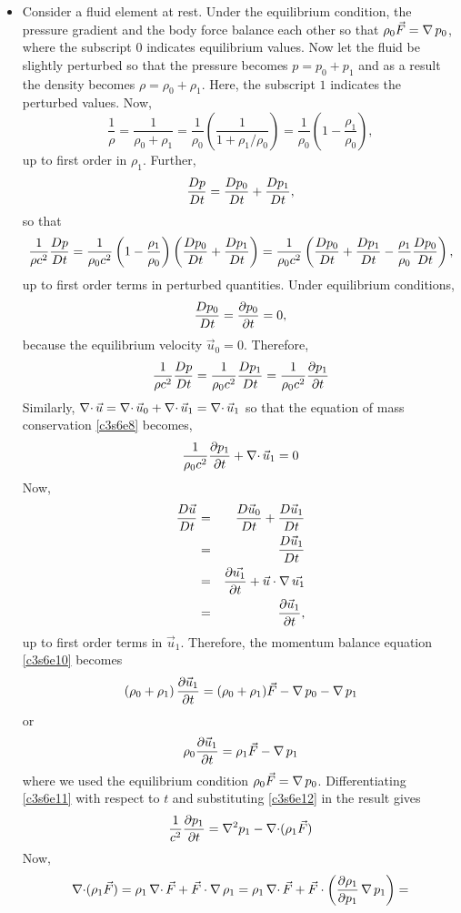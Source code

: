 \begin{itemize}
\item Consider a fluid element at rest. Under the equilibrium condition, the pressure gradient and the body force balance each other so that $\rho_0\vec{F} = \operatorname{\nabla} p_0$, where the 
subscript $0$ indicates equilibrium values. Now let the fluid be slightly perturbed so that the pressure becomes $p = p_0 + p_1$ and as a result the density becomes $\rho = \rho_0 +
\rho_1$. Here, the subscript $1$ indicates the perturbed values. Now,
\[
\frac{1}{\rho} = \frac{1}{\rho_0 + \rho_1} = \frac{1}{\rho_0}\left(\frac{1}{1 + \rho_1/\rho_0}\right) = \frac{1}{\rho_0}\left(1 - \frac{\rho_1}{\rho_0}\right),
\]
up to first order in $\rho_1$. Further,
\[
\frac{D{p}}{Dt} = \frac{D{p_0}}{Dt} + \frac{D{p_1}}{Dt},
\]
so that
\[
\frac{1}{\rho c^2}\frac{D{p}}{Dt} = \frac{1}{\rho_0 c^2}\left(1 - \frac{\rho_1}{\rho_0}\right)\left(\frac{D{p_0}}{Dt} + \frac{D{p_1}}{Dt}\right)
= \frac{1}{\rho_0 c^2}\left(\frac{D{p_0}}{Dt} + \frac{D{p_1}}{Dt} - \frac{\rho_1}{\rho_0}\frac{D{p_0}}{Dt}\right),
\]
up to first order terms in perturbed quantities. Under equilibrium conditions, 
\[
\frac{D{p_0}}{Dt} = \frac{\partial{p_0}}{\partial{t}} = 0,
\]
because the equilibrium velocity $\vec{u}_0 = 0$. Therefore,
\[
\frac{1}{\rho c^2}\frac{D{p}}{Dt} = \frac{1}{\rho_0 c^2}\frac{D{p_1}}{Dt} = \frac{1}{\rho_0 c^2}\frac{\partial{p_1}}{\partial{t}}
\]
Similarly, $\operatorname{\nabla\cdot}\vec{u} = \operatorname{\nabla\cdot}\vec{u}_0 + \operatorname{\nabla\cdot}\vec{u}_1 = \operatorname{\nabla\cdot}\vec{u}_1$ so that the equation of mass conservation \eqref{c3s6e8} becomes,
\begin{equation}\label{c3s6e11}
\frac{1}{\rho_0 c^2}\frac{\partial{p_1}}{\partial{t}} + \operatorname{\nabla\cdot}\vec{u}_1 = 0
\end{equation}
Now,
\begin{eqnarray*}
\frac{D{\vec{u}}}{Dt} &=& \frac{D{\vec{u}_0}}{Dt} + \frac{D{\vec{u}_1}}{Dt} \\
 &=& \frac{D{\vec{u}_1}}{Dt} \\ 
 &=& \frac{\partial{\vec{u_1}}}{\partial{t}} + \vec{u}\cdot\operatorname{\nabla}{\vec{u_1}} \\
 &=& \frac{\partial{\vec{u}_1}}{\partial{t}},
\end{eqnarray*}
up to first order terms in $\vec{u}_1$. Therefore, the momentum balance equation \eqref{c3s6e10} becomes
\[
\left(\rho_0 + \rho_1\right)\frac{\partial{\vec{u}_1}}{\partial{t}} = (\rho_0 + \rho_1)\vec{F} - \operatorname{\nabla} p_0 - \operatorname{\nabla} p_1
\]
or
\begin{equation}\label{c3s6e12}
\rho_0\frac{\partial{\vec{u}_1}}{\partial{t}} = \rho_1\vec{F} - \operatorname{\nabla} p_1
\end{equation}
where we used the equilibrium condition $\rho_0\vec{F} = \operatorname{\nabla} p_0$. Differentiating \eqref{c3s6e11} with respect to $t$ and substituting \eqref{c3s6e12} in the result gives
\[
\frac{1}{c^2}\frac{\partial{p_1}}{\partial{t}} = \nabla^2 p_1 - \operatorname{\nabla\cdot}(\rho_1\vec{F})
\]
Now,
\[
\operatorname{\nabla\cdot}(\rho_1\vec{F}) = \rho_1\operatorname{\nabla\cdot}\vec{F} + \vec{F}\cdot\operatorname{\nabla}\rho_1 = \rho_1\operatorname{\nabla\cdot}\vec{F} + \vec{F}\cdot\left(\frac{\partial{\rho_1}}{\partial{p_1}}\operatorname{\nabla} p_1\right) = 
\]
\end{itemize}
